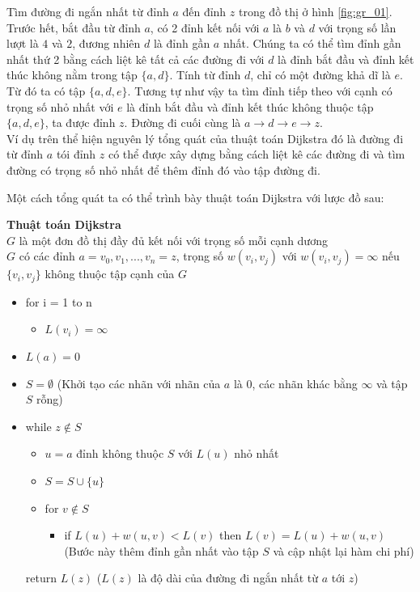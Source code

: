 Tìm đường đi ngắn nhất từ đỉnh $a$ đến đỉnh $z$ trong đồ thị ở hình \ref{fig:gr_01}.\\ 

Trước hết, bắt đầu từ đỉnh $a$, có 2 đỉnh kết nối với $a$ là $b$ và $d$ với trọng số 
lần lượt là $4$ và $2$, đương nhiên $d$ là đỉnh gần $a$ nhất. Chúng ta có thể tìm đỉnh 
gần nhất thứ 2 bằng cách liệt kê tất cả các đường đi với $d$ là đỉnh bắt đầu và đỉnh 
kết thúc không nằm trong tập $\{a, d\}$. Tính từ đỉnh $d$, chỉ có một đường khả dĩ là $e$.
Từ đó ta có tập $\{a, d, e\}$. Tương tự như vậy ta tìm đỉnh tiếp theo với cạnh có trọng số 
nhỏ nhất với $e$ là đỉnh bắt đầu và đỉnh kết thúc không thuộc tập $\{a, d, e\}$, ta được 
đỉnh $z$. Đường đi cuối cùng là $a \to d \to e \to z$. \\

Ví dụ trên thể hiện nguyên lý tổng quát của thuật toán Dijkstra đó là đường đi từ đỉnh $a$
tói đỉnh $z$ có thể được xây dựng bằng cách liệt kê các đường đi và tìm đường có trọng số 
nhỏ nhất để thêm đỉnh đó vào tập đường đi.

Một cách tổng quát ta có thể trình bày thuật toán Dijkstra với lược đồ sau:

\begin{tcolorbox}[colframe=gray,colback=gray!20,left=10pt,right=10pt,top=10pt,bottom=10pt]
    \textbf{Thuật toán Dijkstra} \\
    $G$ là một đơn đồ thị đầy đủ kết nối với trọng số mỗi cạnh dương \\
    $G$ có các đỉnh $a = v_0, v_1, ..., v_n = z$, trọng số 
    $w(v_i, v_j)$ với $w(v_i, v_j) = \infty$ nếu $\{v_i, v_j\}$ không thuộc 
    tập cạnh của $G$

    \begin{itemize}
        \item [] for i = 1 to n 
        \begin{itemize}
            \item [] $L(v_i) = \infty$
        \end{itemize} 
        \item [] $L(a) = 0$
        \item [] $S = \emptyset $ (Khởi tạo các nhãn với nhãn của $a$ là $0$, 
        các nhãn khác bằng $\infty$ và tập $S$ rỗng)
        \item [] while $z \notin S$
        \begin{itemize}
          \item [] $u = a$ đỉnh không thuộc $S$ với $L(u)$ nhỏ nhất
          \item [] $S = S \cup \{u\}$
          \item [] for $v \notin S$
          \begin{itemize}
            \item [] if $L(u) + w(u,v) < L(v)$ then $L(v) = L(u) + w(u,v)$
            (Bước này thêm đỉnh gần nhất vào tập $S$ và cập nhật lại hàm chi phí)
          \end{itemize}
        \end{itemize}
        return $L(z)$ ($L(z)$ là độ dài của đường đi ngắn nhất từ $a$ tới $z$)
    \end{itemize}
  \end{tcolorbox}

